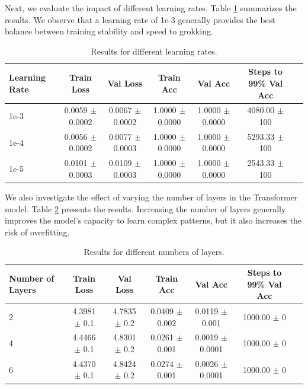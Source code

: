 \documentclass{article} %
\begin{document}
Next, we evaluate the impact of different learning rates. Table \ref{tab:learning_rates} summarizes the results. We observe that a learning rate of 1e-3 generally provides the best balance between training stability and speed to grokking.

\begin{table}[h]
    \centering
    \begin{tabular}{lcccccc}
        \toprule
        Learning Rate & Train Loss & Val Loss & Train Acc & Val Acc & Steps to 99\% Val Acc \\
        \midrule
        1e-3 & 0.0059 $\pm$ 0.0002 & 0.0067 $\pm$ 0.0002 & 1.0000 $\pm$ 0.0000 & 1.0000 $\pm$ 0.0000 & 4080.00 $\pm$ 100 \\
        1e-4 & 0.0056 $\pm$ 0.0002 & 0.0077 $\pm$ 0.0003 & 1.0000 $\pm$ 0.0000 & 1.0000 $\pm$ 0.0000 & 5293.33 $\pm$ 100 \\
        1e-5 & 0.0101 $\pm$ 0.0003 & 0.0109 $\pm$ 0.0003 & 1.0000 $\pm$ 0.0000 & 1.0000 $\pm$ 0.0000 & 2543.33 $\pm$ 100 \\
        \bottomrule
    \end{tabular}
    \caption{Results for different learning rates.}
    \label{tab:learning_rates}
\end{table}

We also investigate the effect of varying the number of layers in the Transformer model. Table \ref{tab:num_layers} presents the results. Increasing the number of layers generally improves the model's capacity to learn complex patterns, but it also increases the risk of overfitting.

\begin{table}[h]
    \centering
    \begin{tabular}{lcccccc}
        \toprule
        Number of Layers & Train Loss & Val Loss & Train Acc & Val Acc & Steps to 99\% Val Acc \\
        \midrule
        2 & 4.3981 $\pm$ 0.1 & 4.7835 $\pm$ 0.2 & 0.0409 $\pm$ 0.002 & 0.0119 $\pm$ 0.001 & 1000.00 $\pm$ 0 \\
        4 & 4.4466 $\pm$ 0.1 & 4.8301 $\pm$ 0.2 & 0.0261 $\pm$ 0.001 & 0.0019 $\pm$ 0.0001 & 1000.00 $\pm$ 0 \\
        6 & 4.4370 $\pm$ 0.1 & 4.8424 $\pm$ 0.2 & 0.0274 $\pm$ 0.001 & 0.0026 $\pm$ 0.0001 & 1000.00 $\pm$ 0 \\
        \bottomrule
    \end{tabular}
    \caption{Results for different numbers of layers.}
    \label{tab:num_layers}
\end{table}
\end{document}
